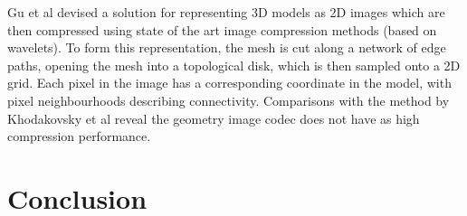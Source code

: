 Gu et al \cite{Gu02Geometry} devised a solution for representing 3D models as 2D images which are then compressed using state of the art image compression methods (based on wavelets). To form this representation, the mesh is cut along a network of edge paths, opening the mesh into a topological disk, which is then sampled onto a 2D grid. Each pixel in the image has a corresponding coordinate in the model, with pixel neighbourhoods describing connectivity. Comparisons with the method by Khodakovsky et al reveal the geometry image codec does not have as high compression performance.



\section{Conclusion}

